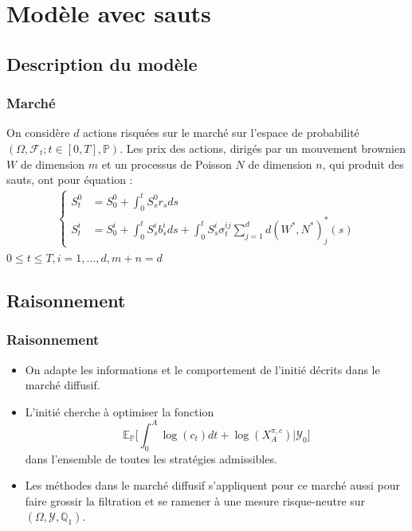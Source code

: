 \documentclass{beamer}
\begin{document}
%

\section{Modèle avec sauts}
\subsection{Description du modèle}

\begin{frame}
\frametitle{Marché}
On considère $d$ actions risquées sur le marché sur l'espace de probabilité $(\Omega, \mathcal{F}_t; t\in [0, T], \mathbb{P})$. Les prix des actions, dirigés par un mouvement brownien $W$ de dimension $m$ et un processus de Poisson $N$ de dimension $n$, qui produit des sauts, ont pour équation :
\begin{align*}
\begin{cases}
S^0_t &= S_0^0 + \int_{0}^{t} S^0_s r_s ds \\
S_t^i &= S_0^i + \int_{0}^{t}S_s^i b_s^i ds + \int_{0}^{t}S_s^i \sigma^{ij}_t \sum_{j = 1}^{d} d(W^*, N^*)^{*}_j(s) \end{cases}
\end{align*}
$ 0 \leq t \leq T, i = 1, ..., d, m+n = d$
\end{frame}

\subsection{Raisonnement}

\begin{frame}
\frametitle{Raisonnement}
\begin{itemize}
\item On adapte les informations et le comportement de l'initié décrits dans le marché diffusif. 
\item L'initié cherche à optimiser la fonction 
\begin{equation*}
\mathbb{E}_{\mathbb{P}} \Big[ \displaystyle \int_{0}^{A} \log (c_t)dt + \log(X_A^{\pi, c})\Big |\mathcal{Y}_0\Big]
\end{equation*}
dans l'ensemble de toutes les stratégies admissibles.
\item Les méthodes dans le marché diffusif s'appliquent pour ce marché aussi pour faire grossir la filtration et se ramener à une mesure risque-neutre sur $(\Omega, \mathcal{Y}, \mathbb{Q}_1)$.
\end{itemize}
\end{frame}
\end{document}

